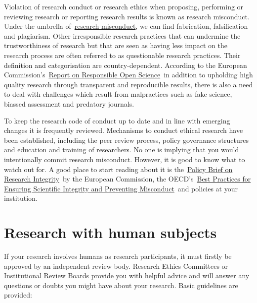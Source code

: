 \documentclass[
]{book}
\begin{document}
Violation of research conduct or research ethics when proposing, performing or reviewing research or reporting research results is known as research misconduct. Under the umbrella of~\href{https://en.wikipedia.org/wiki/Scientific_misconduct}{}\href{https://en.wikipedia.org/wiki/Scientific_misconduct}{research misconduct}, we can find fabrication, falsification and plagiarism. Other irresponsible research practices that can undermine the trustworthiness of research but that are seen as having less impact on the research process are often referred to as questionable research practices. Their definition and categorisation are country-dependent. According to the European Commission's~\href{https://ec.europa.eu/info/sites/default/files/policy_briefing_swafs-30-2020.pdf}{}\href{https://ec.europa.eu/info/sites/default/files/policy_briefing_swafs-30-2020.pdf}{Report on Responsible Open Science}~in addition to upholding high quality research through transparent and reproducible results, there is also a need to deal with challenges which result from malpractices such as fake science, biassed assessment and predatory journals.

To keep the research code of conduct up to date and in line with emerging changes it is frequently reviewed. Mechanisms to conduct ethical research have been established, including the peer review process, policy governance structures and education and training of researchers. No one is implying that you would intentionally commit research misconduct. However, it is good to know what to watch out for. A good place to start reading about it is the~\href{https://ec.europa.eu/research/participants/documents/downloadPublic?documentIds=080166e5bf5c08aa\&appId=PPGMS}{}\href{https://ec.europa.eu/research/participants/documents/downloadPublic?documentIds=080166e5bf5c08aa\&appId=PPGMS}{Policy Brief on Research Integrity}~by the European Commission, the OECD's~\href{https://www.oecd.org/science/inno/40188303.pdf}{}\href{https://www.oecd.org/science/inno/40188303.pdf}{Best Practices for Ensuring Scientific Integrity and Preventing Misconduct}~and policies at your institution.

\hypertarget{research-with-human-subjects}{%
\section{\texorpdfstring{\textbf{Research with human subjects}}{Research with human subjects}}\label{research-with-human-subjects}}

If your research involves humans as research participants, it must firstly be approved by an independent review body. Research Ethics Committees or Institutional Review Boards provide you with helpful advice and will answer any questions or doubts you might have about your research. Basic guidelines are provided:
\end{document}
